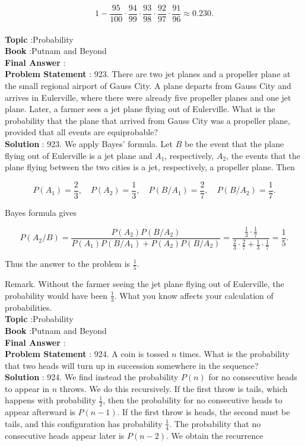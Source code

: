 \documentclass[10pt]{article}
\begin{document}
$$
1-\frac{95}{100} \cdot \frac{94}{99} \cdot \frac{93}{98} \cdot \frac{92}{97} \cdot \frac{91}{96} \approx 0.230 .
$$
\\
\textbf{Topic} :Probability\\
\textbf{Book} :Putnam and Beyond\\
\textbf{Final Answer} :\\


\textbf{Problem Statement} :
923. There are two jet planes and a propeller plane at the small regional airport of Gauss City. A plane departs from Gauss City and arrives in Eulerville, where there were already five propeller planes and one jet plane. Later, a farmer sees a jet plane flying out of Eulerville. What is the probability that the plane that arrived from Gauss City was a propeller plane, provided that all events are equiprobable?
\\
\textbf{Solution} :
923. We apply Bayes' formula. Let $B$ be the event that the plane flying out of Eulerville is a jet plane and $A_{1}$, respectively, $A_{2}$, the events that the plane flying between the two cities is a jet, respectively, a propeller plane. Then

$$
P\left(A_{1}\right)=\frac{2}{3}, \quad P\left(A_{2}\right)=\frac{1}{3}, \quad P\left(B / A_{1}\right)=\frac{2}{7}, \quad P\left(B / A_{2}\right)=\frac{1}{7} .
$$

Bayes formula gives

$$
P\left(A_{2} / B\right)=\frac{P\left(A_{2}\right) P\left(B / A_{2}\right)}{P\left(A_{1}\right) P\left(B / A_{1}\right)+P\left(A_{2}\right) P\left(B / A_{2}\right)}=\frac{\frac{1}{3} \cdot \frac{1}{7}}{\frac{2}{3} \cdot \frac{2}{7}+\frac{1}{3} \cdot \frac{1}{7}}=\frac{1}{5} .
$$

Thus the answer to the problem is $\frac{1}{5}$.

Remark. Without the farmer seeing the jet plane flying out of Eulerville, the probability would have been $\frac{1}{3}$. What you know affects your calculation of probabilities.
\\
\textbf{Topic} :Probability\\
\textbf{Book} :Putnam and Beyond\\
\textbf{Final Answer} :\\


\textbf{Problem Statement} :
924. A coin is tossed $n$ times. What is the probability that two heads will turn up in succession somewhere in the sequence?
\\
\textbf{Solution} :
924. We find instead the probability $P(n)$ for no consecutive heads to appear in $n$ throws. We do this recursively. If the first throw is tails, which happens with probability $\frac{1}{2}$, then the probability for no consecutive heads to appear afterward is $P(n-1)$. If the first throw is heads, the second must be tails, and this configuration has probability $\frac{1}{4}$. The probability that no consecutive heads appear later is $P(n-2)$. We obtain the recurrence
\end{document}

